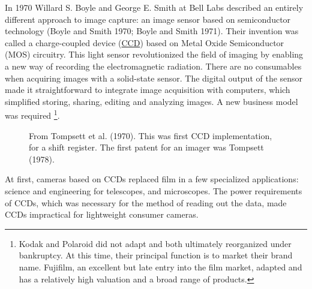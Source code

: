 \documentclass[
  letterpaper,
]{book}
\begin{document}
In 1970 Willard S. Boyle and George E. Smith at Bell Labs described an
entirely different approach to image capture: an image sensor based on
semiconductor technology (Boyle and Smith 1970; Boyle and Smith 1971).
Their invention was called a charge-coupled device
(\href{https://en.wikipedia.org/wiki/Charge-coupled_device}{CCD}) based
on Metal Oxide Semiconductor (MOS) circuitry. This light sensor
revolutionized the field of imaging by enabling a new way of recording
the electromagnetic radiation. There are no consumables when acquiring
images with a solid-state sensor. The digital output of the sensor made
it straightforward to integrate image acquisition with computers, which
simplified storing, sharing, editing and analyzing images. A new
business model was required \footnote{Kodak and Polaroid did not adapt
  and both ultimately reorganized under bankruptcy. At this time, their
  principal function is to market their brand name. Fujifilm, an
  excellent but late entry into the film market, adapted and has a
  relatively high valuation and a broad range of products.}.

\begin{figure}


\caption{\label{fig-tompsett}From Tompsett et al. (1970). This was first
CCD implementation, for a shift register. The first patent for an imager
was Tompsett (1978).}

\end{figure}%

At first, cameras based on CCDs replaced film in a few specialized
applications: science and engineering for telescopes, and microscopes.
The power requirements of CCDs, which was necessary for the method of
reading out the data, made CCDs impractical for lightweight consumer
cameras.
\end{document}
